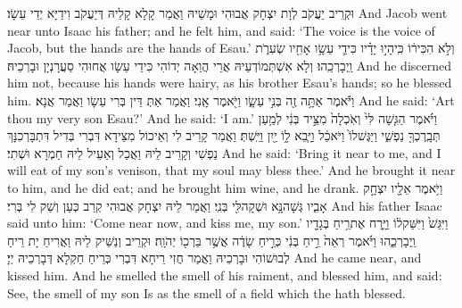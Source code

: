 {וּקְרֵיב יַעֲקֹב לְוָת יִצְחָק אֲבוּהִי וּמָשֵׁיהּ וַאֲמַר קָלָא קָלֵיהּ דְּיַעֲקֹב וִידַיָּא יְדֵי עֵשָׂו׃}
{And Jacob went near unto Isaac his father; and he felt him, and said: ‘The voice is the voice of Jacob, but the hands are the hands of Esau.’}{}
{וְלֹ֣א הִכִּיר֔וֹ כִּֽי\maqqaf הָי֣וּ יָדָ֗יו כִּידֵ֛י עֵשָׂ֥ו אָחִ֖יו שְׂעִרֹ֑ת וַֽיְבָרְכֵֽהוּ׃}
{וְלָא אִשְׁתְּמוֹדְעֵיהּ אֲרֵי הֲוַאָה יְדוֹהִי כִּידֵי עֵשָׂו אֲחוּהִי סַעֲרָנְיָן וּבָרְכֵיהּ׃}
{And he discerned him not, because his hands were hairy, as his brother Esau’s hands; so he blessed him.}{}
{וַיֹּ֕אמֶר אַתָּ֥ה זֶ֖ה בְּנִ֣י עֵשָׂ֑ו וַיֹּ֖אמֶר אָֽנִי׃}
{וַאֲמַר אַתְּ דֵּין בְּרִי עֵשָׂו וַאֲמַר אֲנָא׃}
{And he said: ‘Art thou my very son Esau?’ And he said: ‘I am.’}{}
{וַיֹּ֗אמֶר הַגִּ֤שָׁה לִּי֙ וְאֹֽכְלָה֙ מִצֵּ֣יד בְּנִ֔י לְמַ֥עַן תְּבָֽרֶכְךָ֖ נַפְשִׁ֑י וַיַּגֶּשׁ\maqqaf לוֹ֙ וַיֹּאכַ֔ל וַיָּ֧בֵא ל֦וֹ יַ֖יִן וַיֵּֽשְׁתְּ׃}
{וַאֲמַר קָרֵיב לִי וְאֵיכוֹל מִצֵּידָא דִּבְרִי בְּדִיל דִּתְבָּרְכִנָּךְ נַפְשִׁי וְקָרֵיב לֵיהּ וַאֲכַל וְאַעֵיל לֵיהּ חַמְרָא וּשְׁתִי׃}
{And he said: ‘Bring it near to me, and I will eat of my son’s venison, that my soul may bless thee.’ And he brought it near to him, and he did eat; and he brought him wine, and he drank.}{}
{וַיֹּ֥אמֶר אֵלָ֖יו יִצְחָ֣ק אָבִ֑יו גְּשָׁה\maqqaf נָּ֥א וּשְׁקָה\maqqaf לִּ֖י בְּנִֽי׃}
{וַאֲמַר לֵיהּ יִצְחָק אֲבוּהִי קְרַב כְּעַן וְשַׁק לִי בְּרִי׃}
{And his father Isaac said unto him: ‘Come near now, and kiss me, my son.’}{}
{וַיִּגַּשׁ֙ וַיִּשַּׁק\maqqaf ל֔וֹ וַיָּ֛רַח אֶת\maqqaf רֵ֥יחַ בְּגָדָ֖יו וַֽיְבָרְכֵ֑הוּ וַיֹּ֗אמֶר רְאֵה֙ רֵ֣יחַ בְּנִ֔י כְּרֵ֣יחַ שָׂדֶ֔ה אֲשֶׁ֥ר בֵּרְכ֖וֹ יְהֹוָֽה׃}
{וּקְרֵיב וְנַשֵּׁיק לֵיהּ וַאֲרִיחַ יָת רֵיחַ לְבוּשׁוֹהִי וּבָרְכֵיהּ וַאֲמַר חֲזִי רֵיחָא דִּבְרִי כְּרֵיחַ חַקְלָא דְּבָרְכֵיהּ יְיָ׃}
{And he came near, and kissed him. And he smelled the smell of his raiment, and blessed him, and said: See, the smell of my son Is as the smell of a field which the \lord\space hath blessed.}{}
